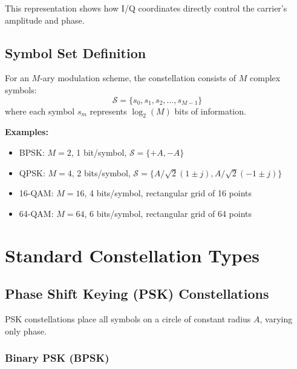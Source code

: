 This representation shows how I/Q coordinates directly control the carrier's amplitude and phase.

\subsection{Symbol Set Definition}

For an $M$-ary modulation scheme, the constellation consists of $M$ complex symbols:
\begin{equation}
\mathcal{S} = \{s_0, s_1, s_2, \ldots, s_{M-1}\}
\end{equation}
where each symbol $s_m$ represents $\log_2(M)$ bits of information.

\textbf{Examples:}
\begin{itemize}
\item BPSK: $M = 2$, 1 bit/symbol, $\mathcal{S} = \{+A, -A\}$
\item QPSK: $M = 4$, 2 bits/symbol, $\mathcal{S} = \{A/\sqrt{2}(1 \pm j), A/\sqrt{2}(-1 \pm j)\}$
\item 16-QAM: $M = 16$, 4 bits/symbol, rectangular grid of 16 points
\item 64-QAM: $M = 64$, 6 bits/symbol, rectangular grid of 64 points
\end{itemize}

\section{Standard Constellation Types}

\subsection{Phase Shift Keying (PSK) Constellations}

PSK constellations place all symbols on a circle of constant radius $A$, varying only phase.

\subsubsection{Binary PSK (BPSK)}

